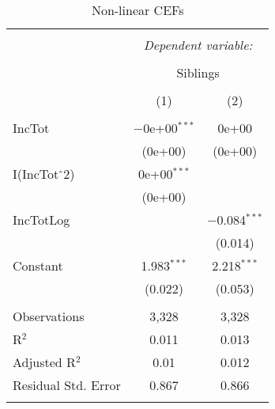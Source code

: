 
\begin{table}[!htbp] \centering 
  \caption{Non-linear CEFs} 
  \label{} 
\begin{tabular}{@{\extracolsep{5pt}}lcc} 
\\[-1.8ex]\hline 
\hline \\[-1.8ex] 
 & \multicolumn{2}{c}{\textit{Dependent variable:}} \\ 
\cline{2-3} 
\\[-1.8ex] & \multicolumn{2}{c}{Siblings} \\ 
\\[-1.8ex] & (1) & (2)\\ 
\hline \\[-1.8ex] 
 IncTot & $-$0e+00$^{***}$ & 0e+00 \\ 
  & (0e+00) & (0e+00) \\ 
  I(IncTot$\hat{\mkern6mu}$2) & 0e+00$^{***}$ &  \\ 
  & (0e+00) &  \\ 
  IncTotLog &  & $-$0.084$^{***}$ \\ 
  &  & (0.014) \\ 
  Constant & 1.983$^{***}$ & 2.218$^{***}$ \\ 
  & (0.022) & (0.053) \\ 
 \hline \\[-1.8ex] 
Observations & 3,328 & 3,328 \\ 
R$^{2}$ & 0.011 & 0.013 \\ 
Adjusted R$^{2}$ & 0.01 & 0.012 \\ 
Residual Std. Error & 0.867 & 0.866 \\ 
\hline 
\hline \\[-1.8ex] 
\end{tabular} 
\end{table} 
